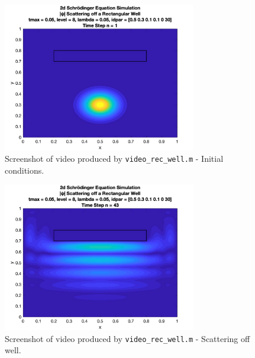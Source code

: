 \documentclass[10pt]{article}
\def\code#1{\texttt{#1}} %
\begin{document}
\begin{figure}[H]
\centering
\includegraphics[width=0.75\textwidth]{problem2/rec_well_1.png}
\caption{Screenshot of video produced by \code{video\_rec\_well.m} - Initial conditions.}
\end{figure}
\begin{figure}[H]
\centering
\includegraphics[width=0.75\textwidth]{problem2/rec_well_2.png}
\caption{Screenshot of video produced by \code{video\_rec\_well.m} - Scattering off well.}
\end{figure}
\end{document}
